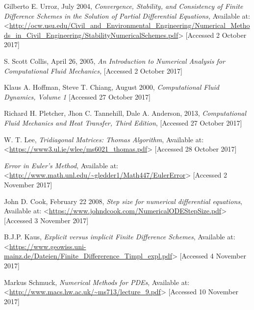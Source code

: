 \documentclass[12pt]{article}
\begin{document}
\newpage
\begin{thebibliography}{0}

Gilberto E. Urroz, July 2004, \textit{Convergence, Stability, and Consistency of Finite
Difference Schemes in the Solution of Partial Differential
Equations,} Available at: <\url{http://ocw.usu.edu/Civil_and_Environmental_Engineering/Numerical_Methods_in_Civil_Engineering/StabilityNumericalSchemes.pdf}> [Accessed 2 October 2017]

S. Scott Collis, April 26, 2005, \textit{An Introduction to Numerical Analysis
for Computational Fluid Mechanics,} [Accessed 2 October 2017]

Klaus A. Hoffman, Steve T. Chiang, August 2000, \textit{Computational Fluid Dynamics, Volume 1} [Accessed 27 October 2017]

Richard H. Pletcher, Jhon C. Tannehill, Dale A. Anderson, 2013, \textit{Computational Fluid Mechanics and Heat Transfer, Third Edition}, [Accessed 27 October 2017]

W. T. Lee, \textit{Tridiagonal Matrices: Thomas Algorithm}, Available at: <\url{https://www3.ul.ie/wlee/ms6021_thomas.pdf}> [Accessed 28 October 2017]

\textit{ Error in Euler’s Method}, Available at: <\url{http://www.math.unl.edu/~gledder1/Math447/EulerError}> [Accessed 2 November 2017]

John D. Cook, February 22 2008, \textit{ Step size for numerical differential equations}, Available at: <\url{https://www.johndcook.com/NumericalODEStepSize.pdf}> [Accessed 3 November 2017]

B.J.P. Kaus, \textit{Explicit versus implicit Finite Difference Schemes}, Available at: <\url{https://www.geowiss.uni-mainz.de/Dateien/Finite_Differerence_Timpl_expl.pdf}> [Accessed 4 November 2017]

Markus Schmuck, \textit{Numerical Methods for PDEs}, Available at: <\url{http://www.macs.hw.ac.uk/~ms713/lecture_9.pdf}> [Accessed 10 November 2017]

\end{thebibliography}
\newpage
\end{document}
